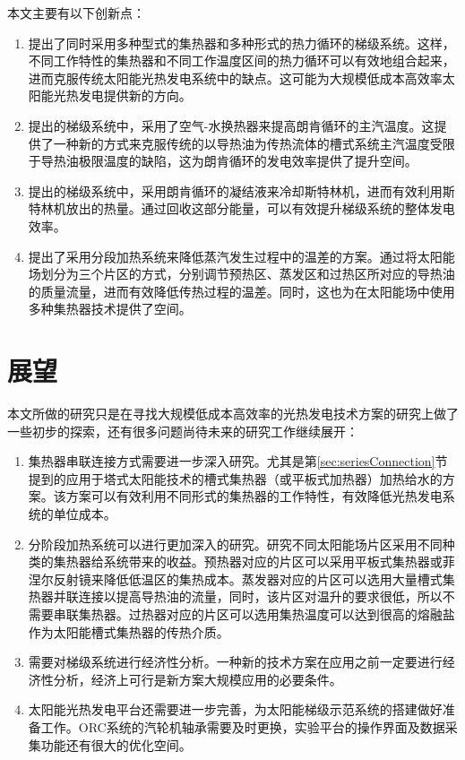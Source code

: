 本文主要有以下创新点：
\begin{enumerate}[label=(\arabic*)]
  \item 提出了同时采用多种型式的集热器和多种形式的热力循环的梯级系统。这样，不同工作特性的集热器和不同工作温度区间的热力循环可以有效地组合起来，进而克服传统太阳能光热发电系统中的缺点。这可能为大规模低成本高效率太阳能光热发电提供新的方向。
  \item 提出的梯级系统中，采用了空气-水换热器来提高朗肯循环的主汽温度。这提供了一种新的方式来克服传统的以导热油为传热流体的槽式系统主汽温度受限于导热油极限温度的缺陷，这为朗肯循环的发电效率提供了提升空间。
  \item 提出的梯级系统中，采用朗肯循环的凝结液来冷却斯特林机，进而有效利用斯特林机放出的热量。通过回收这部分能量，可以有效提升梯级系统的整体发电效率。
  \item 提出了采用分段加热系统来降低蒸汽发生过程中的温差的方案。通过将太阳能场划分为三个片区的方式，分别调节预热区、蒸发区和过热区所对应的导热油的质量流量，进而有效降低传热过程的温差。同时，这也为在太阳能场中使用多种集热器技术提供了空间。
\end{enumerate}

\section{展望}

本文所做的研究只是在寻找大规模低成本高效率的光热发电技术方案的研究上做了一些初步的探索，还有很多问题尚待未来的研究工作继续展开：
\begin{enumerate}[label=(\arabic*)]
  \item 集热器串联连接方式需要进一步深入研究。尤其是第\ref{sec:seriesConnection}节提到的应用于塔式太阳能技术的槽式集热器（或平板式加热器）加热给水的方案。该方案可以有效利用不同形式的集热器的工作特性，有效降低光热发电系统的单位成本。
  \item 分阶段加热系统可以进行更加深入的研究。研究不同太阳能场片区采用不同种类的集热器给系统带来的收益。预热器对应的片区可以采用平板式集热器或菲涅尔反射镜来降低低温区的集热成本。蒸发器对应的片区可以选用大量槽式集热器并联连接以提高导热油的流量，同时，该片区对温升的要求很低，所以不需要串联集热器。过热器对应的片区可以选用集热温度可以达到很高的熔融盐作为太阳能槽式集热器的传热介质。
  \item 需要对梯级系统进行经济性分析。一种新的技术方案在应用之前一定要进行经济性分析，经济上可行是新方案大规模应用的必要条件。
  \item 太阳能光热发电平台还需要进一步完善，为太阳能梯级示范系统的搭建做好准备工作。ORC系统的汽轮机轴承需要及时更换，实验平台的操作界面及数据采集功能还有很大的优化空间。
\end{enumerate}